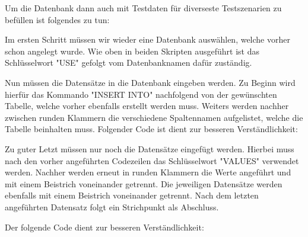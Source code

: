 

Um die Datenbank dann auch mit Testdaten für diverseste Testszenarien zu befüllen ist folgendes zu tun:

Im ersten Schritt müssen wir wieder eine Datenbank auswählen, welche vorher schon angelegt wurde. Wie oben in beiden Skripten ausgeführt ist das Schlüsselwort "USE" gefolgt vom Datenbanknamen dafür zuständig.


Nun müssen die Datensätze in die Datenbank eingeben werden. Zu Beginn wird hierfür das Kommando "INSERT INTO" nachfolgend von der gewünschten Tabelle, welche vorher ebenfalls erstellt werden muss. Weiters werden nachher zwischen runden Klammern die verschiedene Spaltennamen aufgelistet, welche die Tabelle beinhalten muss. Folgender Code ist dient zur besseren Verständlichkeit:


Zu guter Letzt müssen nur noch die Datensätze eingefügt werden. Hierbei muss nach den vorher angeführten Codezeilen das Schlüsselwort "VALUES" verwendet werden. Nachher werden erneut in runden Klammern die Werte angeführt und mit einem Beistrich voneinander getrennt. Die jeweiligen Datensätze werden ebenfalls mit einem Beistrich voneinander getrennt. Nach dem letzten angeführten Datensatz folgt ein Strichpunkt als Abschluss.

Der folgende Code dient zur besseren Verständlichkeit:

